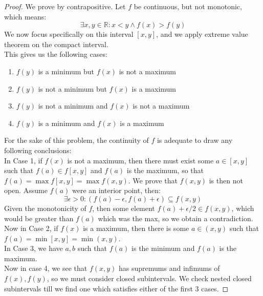 \documentclass[10pt,letterpaper]{article} %
\begin{document}
\begin{proof}
We prove by contrapositive. Let $f$ be continuous, but not monotonic, which means:
\begin{equation*}
\exists x, y \in \mathbb{R}: x < y \land f(x) > f(y)
\end{equation*}
We now focus specifically on this interval $[x, y]$, and we apply extreme value theorem on the compact interval.\\

This gives us the following cases:
\begin{enumerate}
\item $f(y)$ is a minimum but $f(x)$ is not a maximum
\item $f(y)$ is not a minimum but $f(x)$ is a maximum
\item $f(y)$ is not a minimum and $f(x)$ is not a maximum
\item $f(y)$ is a minimum and $f(x)$ is a maximum
\end{enumerate}
For the sake of this problem, the continuity of $f$ is adequate to draw any following conclusions:\\

In Case 1, if $f(x)$ is not a maximum, then there must exist some $a \in [x, y]$ such that $f(a) \in f[x, y]$ and $f(a)$ is the maximum, so that $f(a) = \max f[x, y] = \max f(x, y)$. We prove that $f(x, y)$ is then not open. Assume $f(a)$ were an interior point, then:
\begin{equation}
  \exists \epsilon > 0: (f(a) - \epsilon, f(a) + \epsilon) \subseteq f(x, y)
\end{equation} 
Given the monotonicity of $f$, then some element $f(a) + \epsilon/2 \in f(x, y)$, which would be greater than $f(a)$ which was the max, so we obtain a contradiction.\\

Now in Case 2, if $f(x)$ is a maximum, then there is some $a \in (x, y)$ such that $f(a) = \min [x, y] = \min (x, y)$.\\

In Case 3, we have $a, b$ such that $f(a)$ is the minimum and $f(a)$ is the maximum.\\

Now in case 4, we see that $f(x, y)$ has supremums and infimums of $f(x), f(y)$, so we must consider closed subintervals. We check nested closed subintervals till we find one which satisfies either of the first 3 cases.
\end{proof}


\pagebreak
\end{document}
